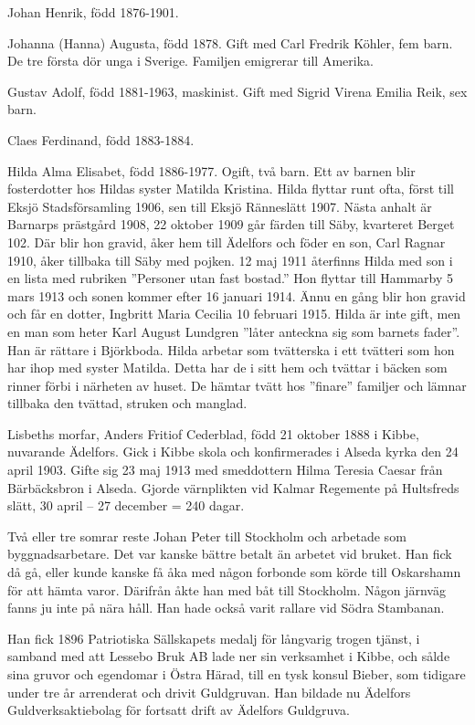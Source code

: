 Johan Henrik, född 1876-1901.

Johanna (Hanna) Augusta, född 1878. Gift med Carl Fredrik Köhler, fem barn. De tre första dör unga i Sverige. Familjen emigrerar till Amerika.

Gustav Adolf, född 1881-1963, maskinist. Gift med Sigrid Virena Emilia Reik, sex barn.

Claes Ferdinand, född 1883-1884.

Hilda Alma Elisabet, född 1886-1977. Ogift, två barn. Ett av barnen blir fosterdotter hos Hildas syster Matilda Kristina. Hilda flyttar runt ofta, först till Eksjö Stadsförsamling 1906, sen till Eksjö Ränneslätt 1907. Nästa anhalt är Barnarps prästgård 1908, 22 oktober 1909 går färden till Säby, kvarteret Berget 102. Där blir hon gravid, åker hem till Ädelfors och föder en son, Carl Ragnar 1910, åker tillbaka till Säby med pojken. 12 maj 1911 återfinns Hilda med son i en lista med rubriken
”Personer utan fast bostad.” Hon flyttar till Hammarby 5 mars 1913 och sonen kommer efter 16 januari 1914. Ännu en gång blir hon gravid och får en dotter, Ingbritt Maria Cecilia 10 februari 1915. Hilda är inte gift, men en man som heter Karl August Lundgren ”låter anteckna sig som barnets fader”. Han är rättare i Björkboda.
Hilda arbetar som tvätterska i ett tvätteri som hon har ihop med syster Matilda. Detta har de i sitt hem och tvättar i bäcken som rinner förbi i närheten av huset. De hämtar tvätt hos ”finare” familjer och lämnar tillbaka den tvättad, struken och manglad.

Lisbeths morfar, Anders Fritiof Cederblad, född 21 oktober 1888 i Kibbe, nuvarande Ädelfors. Gick i Kibbe skola och konfirmerades i Alseda kyrka den 24 april 1903. Gifte sig 23 maj 1913 med smeddottern Hilma Teresia Caesar från Bärbäcksbron i Alseda.
Gjorde värnplikten vid Kalmar Regemente på Hultsfreds slätt, 30 april – 27 december = 240 dagar.

Två eller tre somrar reste Johan Peter till Stockholm och arbetade som byggnadsarbetare.
Det var kanske bättre betalt än arbetet vid bruket. Han fick då gå, eller kunde kanske få åka med någon forbonde som körde till Oskarshamn för att hämta varor. Därifrån åkte han med båt till Stockholm. Någon järnväg fanns ju inte på nära håll. Han hade också varit rallare vid Södra Stambanan.

Han fick 1896 Patriotiska Sällskapets medalj för långvarig trogen tjänst, i samband med att Lessebo Bruk AB lade ner sin verksamhet i Kibbe, och sålde sina gruvor och egendomar i Östra Härad, till en tysk konsul Bieber, som tidigare under tre år arrenderat och drivit Guldgruvan. Han bildade nu Ädelfors Guldverksaktiebolag för fortsatt drift av Ädelfors Guldgruva.


